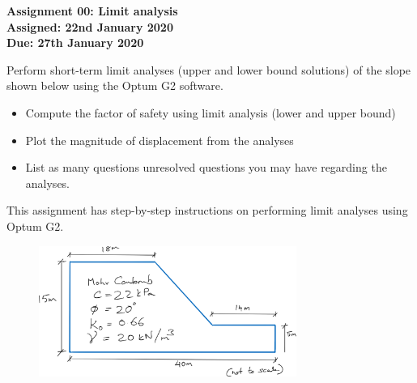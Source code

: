 \documentclass[a4paper,12pt]{article}
\begin{document}
\begin{centering}
	\textbf{
		Assignment 00: Limit analysis\\
		Assigned: 22nd January 2020\\
		Due: 27th January 2020\\
	}
\end{centering}

\vspace{1em}
 
Perform short-term limit analyses (upper and lower bound solutions) of the slope shown below using the Optum G2 software. 

\begin{itemize}
	\item Compute the factor of safety using limit analysis (lower and upper bound)
	\item Plot the magnitude of displacement from the analyses
	\item List as many questions unresolved questions you may have regarding the analyses.
\end{itemize}

This assignment has step-by-step instructions on performing limit analyses using Optum G2.

\begin{figure}[!h]
	\centering
	\includegraphics[width=0.75\textwidth]{figs/slope.png}
\end{figure}
\end{document}
